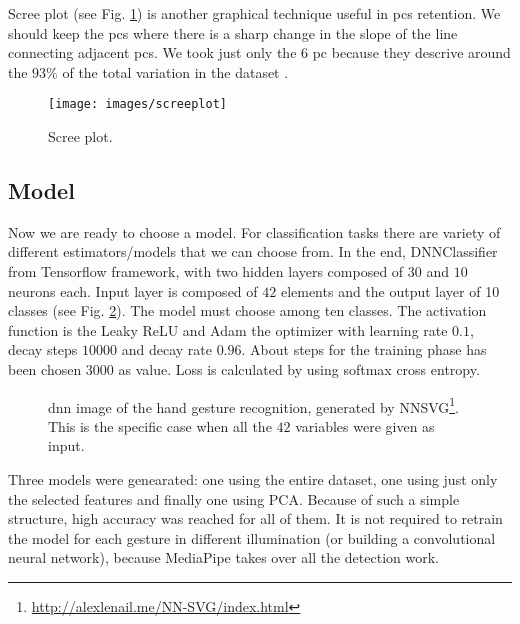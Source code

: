\noindent Scree plot (see Fig. \ref{fig:screeplot}) is another graphical technique useful in \glspl{pc} retention. We should keep the \glspl{pc} where there is a sharp change in the slope of the line connecting adjacent \glspl{pc}. We took just only the $6$ \gls{pc} because they descrive around the $93\%$ of the total variation in the dataset .

\begin{figure}[H]
	\centering
	\texttt{[image: images/screeplot]}
	\caption[Scree plot.]{Scree plot.}
	\label{fig:screeplot}
\end{figure}

\subsection{Model}
\label{sec:model}
Now we are ready to choose a model. For classification tasks there are variety of different estimators/models that we can choose from. In the end, DNNClassifier from Tensorflow framework, with two hidden layers composed of $30$ and $10$ neurons each. Input layer is composed of $42$ elements and the output layer of 10 classes (see Fig. \ref{fig:handarch}). The model must choose among ten classes. The activation function is the Leaky ReLU and Adam the optimizer with learning rate $0.1$, decay steps $10000$ and decay rate $0.96$. About steps for the training phase has been chosen $3000$ as value. Loss is calculated by using softmax cross entropy.


\begin{figure}[H]
	\caption[Hand gesture reconognition \gls{nn}.] {\gls{dnn} image of the hand gesture recognition, generated by NNSVG\footnote{\url{http://alexlenail.me/NN-SVG/index.html}}. This is the specific case when all the $42$ variables were given as input.}
	\label{fig:handarch}
\end{figure}

\noindent Three models were genearated: one using the entire dataset, one using just only the selected features and finally one using PCA. Because of such a simple structure, high accuracy was reached for all of them. It is not required to retrain the model for each gesture in different illumination (or building a convolutional neural network), because MediaPipe takes over all the detection work.

